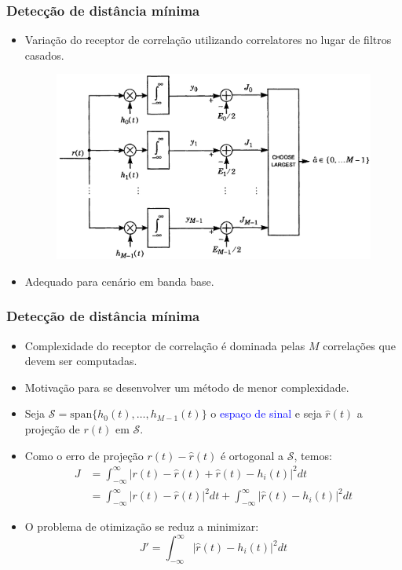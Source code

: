 \begin{frame}
	\frametitle{Detecção de distância mínima}

	\begin{itemize}
	    \item Variação do receptor de correlação utilizando correlatores no lugar de filtros casados.
	    \begin{figure}[t]	
	      \begin{center}
		\includegraphics[width=0.7\columnwidth]{figs/adv_03}
	      \end{center}
	    \end{figure}
	    \item Adequado para cenário em banda base.
	\end{itemize}
\end{frame}

\begin{frame}
	\frametitle{Detecção de distância mínima}

	\begin{itemize}
	    \item Complexidade do receptor de correlação é dominada pelas $M$ correlações que devem ser computadas.
	    \item Motivação para se desenvolver um método de menor complexidade.
	    \item Seja $\mathcal{S} = \mathrm{span}\{h_0(t),\ldots,h_{M-1}(t) \}$ o \textcolor{blue}{espaço de sinal} e seja $\hat{r}(t)$ a projeção de $r(t)$ em $\mathcal{S}$.
	    \item Como o erro de projeção $r(t)-\hat{r}(t)$ é ortogonal a $\mathcal{S}$, temos:
	    \begin{align*}
		J &= \int_{-\infty}^{\infty}|r(t) - \hat{r}(t) + \hat{r}(t) - h_i(t)|^2 dt \\
		&= \int_{-\infty}^{\infty}|r(t) - \hat{r}(t)|^2 dt + \int_{-\infty}^{\infty}|\hat{r}(t) - h_i(t)|^2 dt
	    \end{align*}
	    \item O problema de otimização se reduz a minimizar:
	    \begin{equation*}
		J' = \int_{-\infty}^{\infty} |\hat{r}(t) - h_i(t)|^2 dt
	    \end{equation*}

	\end{itemize}
\end{frame}


